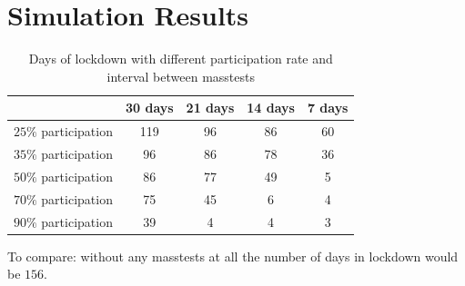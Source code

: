 \documentclass
[
    a4paper,
    11pt,
    bibliography = totoc,
    listof = totoc,
    headinclude = true,
]
{scrreport}
\begin{document}
\chapter{Simulation Results}


\begin{table}[!h]
{\small%
\begin{center}
\begin{tabular}{|c||c|c|c|c|}
\hline
& 30 days    & 21 days   & 14 days  & 7 days  \\
 \hline
 \hline
     $25\%$ participation & 119 &96 & 86 & 60\\
 \hline
     $35\%$ participation    & 96 &  86&  78  & 36   \\
 \hline
     $50\%$ participation & 86 & 77 & 49 & 5\\
 \hline
     $70\%$ participation & 75 &  45 & 6 & 4 \\
 \hline
     $90\%$ participation & 39 &4 &4  & 3\\
     \hline
\end{tabular}
\end{center}
}%

\caption{Days of lockdown with different participation rate and interval between masstests}
\end{table}
To compare: without any masstests at all the number of days in lockdown would be $156$.

\printbibliography
\end{document}
